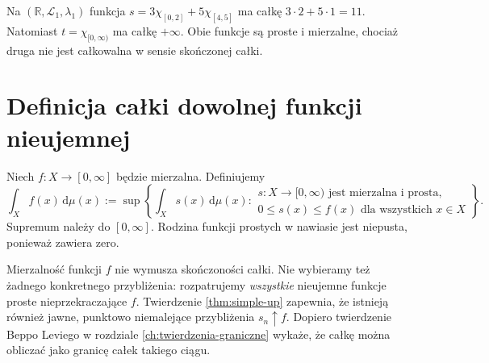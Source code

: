 \begin{przyklad}
Na $(\mathbb R,\mathcal L_1,\lambda_1)$ funkcja
$s=3\chi_{[0,2]}+5\chi_{[4,5]}$ ma całkę
$3\cdot2+5\cdot1=11$. Natomiast
$t=\chi_{[0,\infty)}$ ma całkę $+\infty$.
Obie funkcje są proste i mierzalne, chociaż druga
nie jest całkowalna w sensie skończonej całki.
\end{przyklad}

\section{Definicja całki dowolnej funkcji nieujemnej}

\begin{definicja}
\label{def:integral-positive}
Niech $f:X\to[0,\infty]$ będzie mierzalna. Definiujemy
\begin{equation}\label{eq:positive-integral}
\int_X f(x)\,\mathrm d\mu(x)
:=\sup\left\{\int_X s(x)\,\mathrm d\mu(x):
\begin{array}{l}
 s:X\to[0,\infty)\text{ jest mierzalna i prosta},\\[-2pt]
 0\le s(x)\le f(x)\text{ dla wszystkich }x\in X
\end{array}\right\}.
\end{equation}
Supremum należy do $[0,\infty]$. Rodzina funkcji
prostych w nawiasie jest niepusta, ponieważ zawiera zero.
\end{definicja}

\begin{uwaga}
Mierzalność funkcji $f$ nie wymusza skończoności całki.
Nie wybieramy też żadnego konkretnego przybliżenia:
rozpatrujemy \emph{wszystkie} nieujemne funkcje proste
nieprzekraczające $f$. Twierdzenie
\ref{thm:simple-up} zapewnia, że istnieją również
jawne, punktowo niemalejące przybliżenia $s_n\uparrow f$.
Dopiero twierdzenie Beppo Leviego w rozdziale
\ref{ch:twierdzenia-graniczne} wykaże, że całkę można
obliczać jako granicę całek takiego ciągu.
\end{uwaga}


